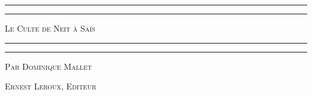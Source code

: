 \documentclass[a4paper, 11pt, oneside]{article}
\begin{document}
\renewcommand{\thefigure}{\Fontlukas\bfseries{\arabic{figure}}}

\renewcommand\thefootnote{{\Fontlukas\bfseries\color{White}{\arabic{footnote}}}}
\let\oldfootnote\footnote
    \renewcommand{\footnote}[1]{\oldfootnote{{\normalsize\Fontlukas\bfseries\color{White}#1}}}

\begin{titlepage} %
	\centering %

	
	\rule{\textwidth}{1.6pt}\vspace*{-\baselineskip}\vspace*{2pt} %
	\rule{\textwidth}{0.4pt} %
	
	\vspace{1\baselineskip} %
	
	{\scshape\Huge Le Culte de Neit à Saïs}
	
	\vspace{1\baselineskip} %

	\rule{\textwidth}{0.4pt}\vspace*{-\baselineskip}\vspace{3.2pt} %
	\rule{\textwidth}{1.6pt} %
	
	\vspace{1\baselineskip} %
	
	
	{\scshape \Large Par Dominique Mallet} %
	
	\vspace*{1\baselineskip} %
	
        {\scshape\scriptsize Ernest Leroux, Editeur} %
    
        \vspace*{\fill}

	\vspace{1\baselineskip}


\end{titlepage}
\end{document}

